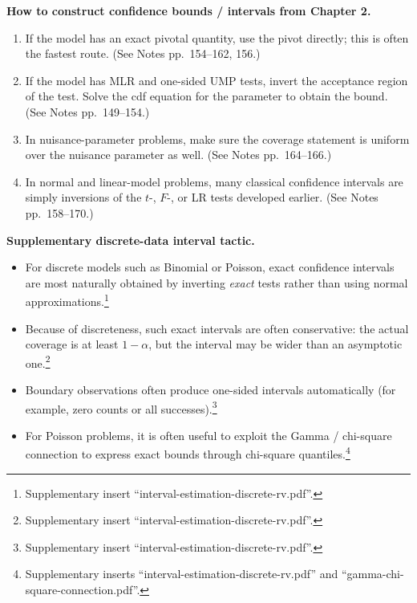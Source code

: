 \begin{mybox}
\textbf{How to construct confidence bounds / intervals from Chapter 2.}
\begin{enumerate}
    \item If the model has an exact pivotal quantity, use the pivot directly; this is often the fastest route. (See Notes pp.~154--162, 156.)
    \item If the model has MLR and one-sided UMP tests, invert the acceptance region of the test. Solve the cdf equation for the parameter to obtain the bound. (See Notes pp.~149--154.)
    \item In nuisance-parameter problems, make sure the coverage statement is uniform over the nuisance parameter as well. (See Notes pp.~164--166.)
    \item In normal and linear-model problems, many classical confidence intervals are simply inversions of the $t$-, $F$-, or LR tests developed earlier. (See Notes pp.~158--170.)
\end{enumerate}
\end{mybox}

\begin{mybox}
\textbf{Supplementary discrete-data interval tactic.}
\begin{itemize}
    \item For discrete models such as Binomial or Poisson, exact confidence intervals are most naturally obtained by inverting \emph{exact} tests rather than using normal approximations.\footnote{Supplementary insert ``interval-estimation-discrete-rv.pdf''.}
    \item Because of discreteness, such exact intervals are often conservative: the actual coverage is at least $1-\alpha$, but the interval may be wider than an asymptotic one.\footnote{Supplementary insert ``interval-estimation-discrete-rv.pdf''.}
    \item Boundary observations often produce one-sided intervals automatically (for example, zero counts or all successes).\footnote{Supplementary insert ``interval-estimation-discrete-rv.pdf''.}
    \item For Poisson problems, it is often useful to exploit the Gamma / chi-square connection to express exact bounds through chi-square quantiles.\footnote{Supplementary inserts ``interval-estimation-discrete-rv.pdf'' and ``gamma-chi-square-connection.pdf''.}
\end{itemize}
\end{mybox}

